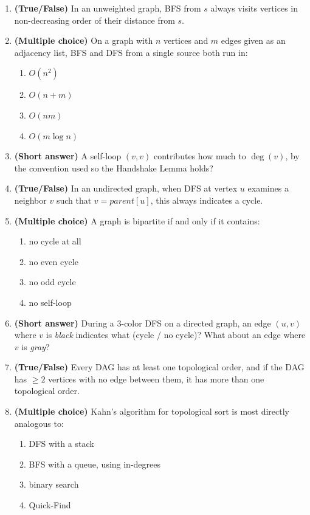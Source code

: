 \documentclass[11pt]{article}
\begin{document}
\begin{enumerate}[label=\textbf{B\arabic*.}, leftmargin=2.2em]

\item \textbf{(True/False)} In an unweighted graph, BFS from $s$ always visits vertices
in non-decreasing order of their distance from $s$.

\item \textbf{(Multiple choice)} On a graph with $n$ vertices and $m$ edges given as an
adjacency list, BFS and DFS from a single source both run in:
\begin{enumerate}[label=(\alph*)]
    \item $O(n^2)$
    \item $O(n + m)$
    \item $O(nm)$
    \item $O(m \log n)$
\end{enumerate}

\item \textbf{(Short answer)} A self-loop $(v,v)$ contributes how much to $\deg(v)$, by
the convention used so the Handshake Lemma holds?

\item \textbf{(True/False)} In an undirected graph, when DFS at vertex $u$ examines a
neighbor $v$ such that $v = parent[u]$, this always indicates a cycle.

\item \textbf{(Multiple choice)} A graph is bipartite if and only if it contains:
\begin{enumerate}[label=(\alph*)]
    \item no cycle at all
    \item no even cycle
    \item no odd cycle
    \item no self-loop
\end{enumerate}

\item \textbf{(Short answer)} During a 3-color DFS on a directed graph, an edge $(u,v)$
where $v$ is \emph{black} indicates what (cycle / no cycle)? What about an edge where $v$
is \emph{gray}?

\item \textbf{(True/False)} Every DAG has at least one topological order, and if the DAG
has $\ge 2$ vertices with no edge between them, it has more than one topological order.

\item \textbf{(Multiple choice)} Kahn's algorithm for topological sort is most directly
analogous to:
\begin{enumerate}[label=(\alph*)]
    \item DFS with a stack
    \item BFS with a queue, using in-degrees
    \item binary search
    \item Quick-Find
\end{enumerate}


\end{enumerate}
\end{document}
